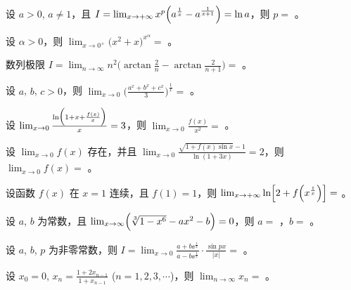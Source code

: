 \begin{ti}
	设 $a > 0$, $a \ne 1$，且 $I = \lim_{x \to +\infty} x^p \Bigl( a^{\frac{1}{x}} - a^{\frac{1}{x+1}} \Bigr) = \ln a$，则 $p = $ \hua。
\end{ti}

\begin{ti}
	设 $\alpha > 0$，则 $\lim_{x \to 0^{+}} \bigl( x^2 + x \bigr)^{x^\alpha} = $ \hua。
\end{ti}

\begin{ti}
	数列极限 $I = \lim_{n \to \infty} n^2 \biggl( \arctan \frac{2}{n} - \arctan \frac{2}{n+1} \biggr) = $ \hua。
\end{ti}

\begin{ti}
	设 $a$, $b$, $c > 0$，则 $\lim_{x \to 0} \biggl( \frac{a^x + b^x + c^x}{3} \biggr)^{\frac{1}{x}} = $ \hua。
\end{ti}

\begin{ti}
	设 $\lim_{x \to 0} \frac{\ln \Bigl( 1 + x + \frac{f(x)}{x} \Bigr)}{x} = 3$，则 $\lim_{x \to 0} \frac{f(x)}{x^2} = $ \hua。
\end{ti}

\begin{ti}
	设 $\lim_{x \to 0} f(x)$ 存在，并且 $\lim_{x \to 0} \frac{\sqrt{1 + f(x) \sin x} - 1}{\ln(1 + 3x)} = 2$，则 $\lim_{x \to 0} f(x) = $ \hua。
\end{ti}

\begin{ti}
	设函数 $f(x)$ 在 $x = 1$ 连续，且 $f(1) = 1$，则 $\lim_{x \to +\infty} \ln\Bigl[2 + f\Bigl( x^{\frac{1}{x}} \Bigr)\Bigr] = $ \hua。
\end{ti}

\begin{ti}
	设 $a$, $b$ 为常数，且 $\lim_{x \to \infty} \Bigl( \sqrt[3]{1 - x^6} - ax^2 - b \Bigr) = 0$，则 $a = $ \hua，$b = $ \hua。
\end{ti}

\begin{ti}
	设 $a$, $b$, $p$ 为非零常数，则 $I = \lim_{x \to 0} \frac{a + b \ee^{\frac{1}{x}}}{a - b \ee^{\frac{1}{x}}} \cdot \frac{\sin px}{|x|} = $ \hua。
\end{ti}

\begin{ti}
	设 $x_{0} = 0$, $x_{n} = \frac{1 + 2x_{n-1}}{1 + x_{n-1}}$ ($n=1,2,3,\cdots$)，则 $\lim_{n \to \infty}x_{n} = $ \hua。
\end{ti}

